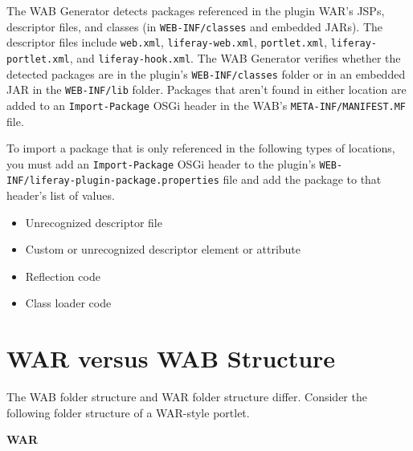 The WAB Generator detects packages referenced in the plugin WAR's JSPs,
descriptor files, and classes (in \texttt{WEB-INF/classes} and embedded
JARs). The descriptor files include \texttt{web.xml},
\texttt{liferay-web.xml}, \texttt{portlet.xml},
\texttt{liferay-portlet.xml}, and \texttt{liferay-hook.xml}. The WAB
Generator verifies whether the detected packages are in the plugin's
\texttt{WEB-INF/classes} folder or in an embedded JAR in the
\texttt{WEB-INF/lib} folder. Packages that aren't found in either
location are added to an \texttt{Import-Package} OSGi header in the
WAB's \texttt{META-INF/MANIFEST.MF} file.

To import a package that is only referenced in the following types of
locations, you must add an \texttt{Import-Package} OSGi header to the
plugin's \texttt{WEB-INF/liferay-plugin-package.properties} file and add
the package to that header's list of values.

\begin{itemize}
\tightlist
\item
  Unrecognized descriptor file
\item
  Custom or unrecognized descriptor element or attribute
\item
  Reflection code
\item
  Class loader code
\end{itemize}

\section{WAR versus WAB Structure}\label{war-versus-wab-structure}

The WAB folder structure and WAR folder structure differ. Consider the
following folder structure of a WAR-style portlet.

\textbf{WAR}

